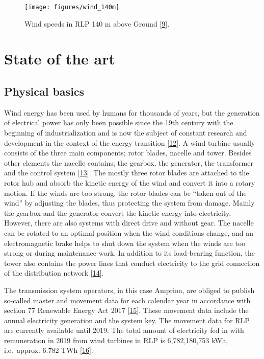 \documentclass[a4paper,11pt]{article}
\begin{document}
\begin{figure}[H]

{\centering \texttt{[image: figures/wind\_140m]} 

}

\caption{Wind speeds in RLP 140 m above Ground {[}\protect\hyperlink{ref-MinisteriumfurWirtschaftKlimaschutzEnergieundLandesplanung.2013}{9}{]}.}\label{fig:wind}
\end{figure}
\hypertarget{state-of-the-art}{%
\section{State of the art}\label{state-of-the-art}}

\hypertarget{physical-basics}{%
\subsection{Physical basics}\label{physical-basics}}

Wind energy has been used by humans for thousands of years, but the generation of electrical power has only been possible since the 19th century with the beginning of industrialization and is now the subject of constant research and development in the context of the energy transition {[}\protect\hyperlink{ref-Wikipedia.2021}{12}{]}. A wind turbine usually consists of the three main components; rotor blades, nacelle and tower. Besides other elements the nacelle contains; the gearbox, the generator, the transformer and the control system {[}\protect\hyperlink{ref-MladenBosnjakovic.2013}{13}{]}. The mostly three rotor blades are attached to the rotor hub and absorb the kinetic energy of the wind and convert it into a rotary motion. If the winds are too strong, the rotor blades can be ``taken out of the wind'' by adjusting the blades, thus protecting the system from damage. Mainly the gearbox and the generator convert the kinetic energy into electricity. However, there are also systems with direct drive and without gear. The nacelle can be rotated to an optimal position when the wind conditions change, and an electromagnetic brake helps to shut down the system when the winds are too strong or during maintenance work. In addition to its load-bearing function, the tower also contains the power lines that conduct electricity to the grid connection of the distribution network {[}\protect\hyperlink{ref-NetzKonstrukteur.16.11.2020}{14}{]}.

The transmission system operators, in this case Amprion, are obliged to publish so-called master and movement data for each calendar year in accordance with section 77 Renewable Energy Act 2017 {[}\protect\hyperlink{ref-Bundesgestzblatt.2017}{15}{]}. These movement data include the annual electricity generation and the system key. The movement data for RLP are currently available until 2019. The total amount of electricity fed in with remuneration in 2019 from wind turbines in RLP is 6,782,180,753 kWh, i.e.~approx. 6.782 TWh {[}\protect\hyperlink{ref-EnergieagenturRheinlandPfalz.2019}{16}{]}.
\end{document}
